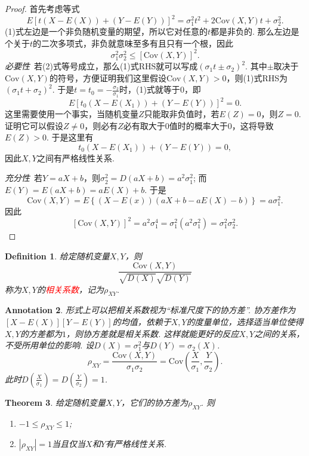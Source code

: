 \documentclass{article}
\newtheorem{theorem}{Theorem}[section]
\newtheorem{definition}[theorem]{Definition}
\newtheorem{annotation}[theorem]{Annotation}
\newcommand{\redt}[1]{\textcolor{red}{#1}}
\begin{document}
\begin{proof}
首先考虑等式
\begin{equation}
E\left[t(X-E(X)) + (Y-E(Y))\right]^2 = \sigma_1^2t^2 + 2\text{Cov}(X,Y)t + \sigma_2^2.
\end{equation}
(1)式左边是一个非负随机变量的期望，所以它对任意的$t$都是非负的. 那么左边是个关于$t$的二次多项式，非负就意味至多有且只有一个根，因此
\begin{equation}
\sigma_1^2\sigma_2^2 \leq \left[\text{Cov}(X,Y)\right]^2.
\end{equation}
\emph{必要性}\ 若(2)式等号成立，那么(1)式RHS就可以写成$(\sigma_1t \pm \sigma_2)^2$. 其中$\pm$取决于$\text{Cov}(X,Y)$的符号，方便证明我们这里假设$\text{Cov}(X,Y) > 0$，则(1)式RHS为$(\sigma_1t +\sigma_2)^2$. 于是$t=t_0=-\frac{\sigma_2}{\sigma_1}$时，(1)式就等于$0$，即
$$
E\left[t_0(X-E(X_1)) + (Y-E(Y))\right]^2 = 0.
$$
这里需要使用一个事实，当随机变量$Z$只能取非负值时，若$E(Z) = 0$，则$Z=0$. 证明它可以假设$Z \neq 0$，则必有$Z$必有取大于$0$值时的概率大于$0$，这将导致$E(Z) > 0$. 于是这里有
$$
t_0(X-E(X_1)) + (Y-E(Y)) = 0,
$$
因此$X,Y$之间有严格线性关系.

\emph{充分性}\ 若$Y=aX+b$，则$\sigma_2^2 = D(aX+b)=a^2\sigma_1^2$; 而$E(Y) = E(aX+b) = aE(X)+b$. 于是
$$
\text{Cov}(X,Y) = E\left\{(X-E(x))(aX+b-aE(X)-b)\right\} = a\sigma_1^2.
$$
因此
$$
[\text{Cov}(X,Y)]^2  =a^2\sigma_1^4=\sigma_1^2(a^2\sigma_1^2) =\sigma_1^2\sigma_2^2.
$$
\end{proof}

\begin{definition}
\rm 给定随机变量$X,Y$，则
$$
\frac{\text{Cov}(X,Y)}{\sqrt{D(X)}\sqrt{D(Y)}}
$$
称为$X,Y$的\redt{相关系数}，记为$\rho_{XY}$.
\end{definition}

\begin{annotation}
\rm 形式上可以把相关系数视为“标准尺度下的协方差”. 协方差作为$[X-E(X)][Y-E(Y)]$的均值，依赖于$X,Y$的度量单位，选择适当单位使得$X,Y$的方差都为$1$，则协方差就是相关系数. 这样就能更好的反应$X,Y$之间的关系，不受所用单位的影响. 设$D(X)=\sigma_1^2$与$D(Y)=\sigma_2(X)$.
$$
\rho_{XY}=\frac{\text{Cov}(X,Y)}{\sigma_1\sigma_2} = \text{Cov}(\frac{X}{\sigma_1},\frac{Y}{\sigma_2}).
$$
此时$D(\frac{X}{\sigma_1})=D(\frac{Y}{\sigma_2}) = 1$.
\end{annotation}

\begin{theorem}
\rm 给定随机变量$X,Y$，它们的协方差为$\rho_{XY}$. 则
\begin{enumerate}
	\item $ -1 \leq \rho_{XY} \leq 1$;
	\item $|\rho_{XY}| = 1$当且仅当$X$和$Y$有严格线性关系. 
\end{enumerate} 
\end{theorem}
\end{document}
